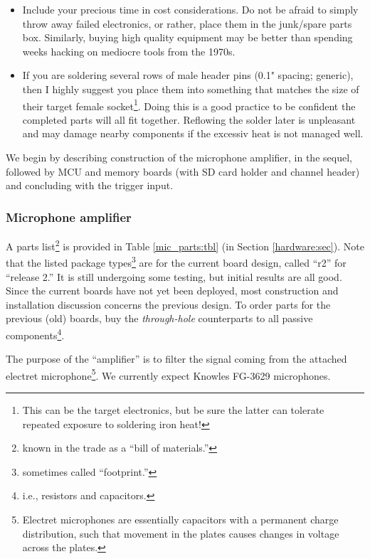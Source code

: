 \documentclass[letterpaper]{article}
\begin{document}
\begin{itemize}
\item Include your precious time in cost considerations. Do not be
  afraid to simply throw away failed electronics, or rather, place
  them in the junk/spare parts box. Similarly, buying high quality
  equipment may be better than spending weeks hacking on mediocre
  tools from the 1970s.

\item If you are soldering several rows of male header pins (0.1"
  spacing; generic), then I highly suggest you place them into
  something that matches the size of their target female
  socket\footnote{This can be the target electronics, but be sure the
    latter can tolerate repeated exposure to soldering iron
    heat!}. Doing this is a good practice to be confident the
  completed parts will all fit together. Reflowing the solder later is
  unpleasant and may damage nearby components if the excessiv heat is
  not managed well.
\end{itemize}

We begin by describing construction of the microphone amplifier, in
the sequel, followed by MCU and memory boards (with SD card holder and
channel header) and concluding with the trigger input.

\subsubsection{Microphone amplifier}

A parts list\footnote{known in the trade as a ``bill of materials.''}
is provided in Table \ref{mic_parts:tbl} (in Section
\ref{hardware:sec}). Note that the listed package
types\footnote{sometimes called ``footprint.''} are for the current
board design, called ``r2'' for ``release 2.'' It is still undergoing
some testing, but initial results are all good. Since the current
boards have not yet been deployed, most construction and installation
discussion concerns the previous design. To order parts for the
previous (old) boards, buy the \textit{through-hole} counterparts to
all passive components\footnote{i.e., resistors and capacitors.}.

The purpose of the ``amplifier'' is to filter the signal coming from
the attached electret microphone\footnote{Electret microphones are
  essentially capacitors with a permanent charge distribution, such
  that movement in the plates causes changes in voltage across the
  plates.}. We currently expect Knowles FG-3629 microphones.
\end{document}

